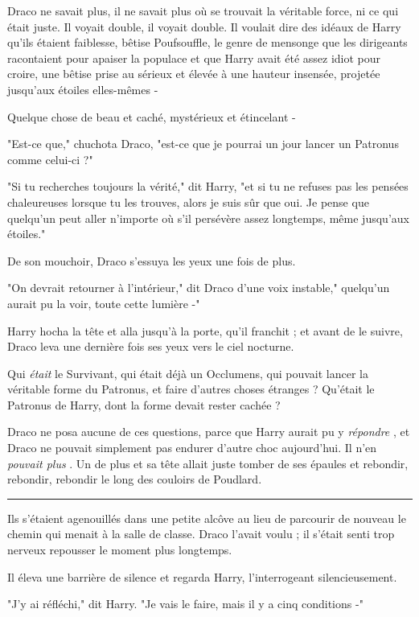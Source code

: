 Draco ne savait plus, il ne savait plus où se trouvait la véritable force, ni ce qui était juste. Il voyait double, il voyait double. Il voulait dire des idéaux de Harry qu'ils étaient faiblesse, bêtise Poufsouffle, le genre de mensonge que les dirigeants racontaient pour apaiser la populace et que Harry avait été assez idiot pour croire, une bêtise prise au sérieux et élevée à une hauteur insensée, projetée jusqu'aux étoiles elles-mêmes -

Quelque chose de beau et caché, mystérieux et étincelant -

"Est-ce que," chuchota Draco, "est-ce que je pourrai un jour lancer un Patronus comme celui-ci ?"

"Si tu recherches toujours la vérité," dit Harry, "et si tu ne refuses pas les pensées chaleureuses lorsque tu les trouves, alors je suis sûr que oui. Je pense que quelqu'un peut aller n'importe où s'il persévère assez longtemps, même jusqu'aux étoiles."

De son mouchoir, Draco s'essuya les yeux une fois de plus.

"On devrait retourner à l'intérieur," dit Draco d'une voix instable," quelqu'un aurait pu la voir, toute cette lumière -"

Harry hocha la tête et alla jusqu'à la porte, qu'il franchit ; et avant de le suivre, Draco leva une dernière fois ses yeux vers le ciel nocturne.

Qui \emph{était}  le Survivant, qui était déjà un Occlumens, qui pouvait lancer la véritable forme du Patronus, et faire d'autres choses étranges ? Qu'était le Patronus de Harry, dont la forme devait rester cachée ?

Draco ne posa aucune de ces questions, parce que Harry aurait pu y \emph{répondre} , et Draco ne pouvait simplement pas endurer d'autre choc aujourd'hui. Il n'en \emph{pouvait plus} . Un de plus et sa tête allait juste tomber de ses épaules et rebondir, rebondir, rebondir le long des couloirs de Poudlard.
\par\noindent\rule{\textwidth}{0.4pt}
Ils s'étaient agenouillés dans une petite alcôve au lieu de parcourir de nouveau le chemin qui menait à la salle de classe. Draco l'avait voulu ; il s'était senti trop nerveux repousser le moment plus longtemps.

Il éleva une barrière de silence et regarda Harry, l'interrogeant silencieusement.

"J'y ai réfléchi," dit Harry. "Je vais le faire, mais il y a cinq conditions -"

